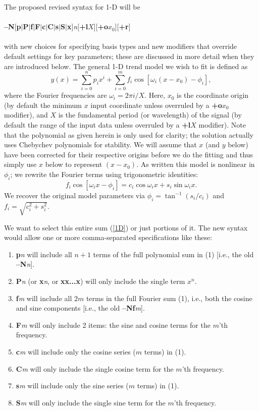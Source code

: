 \documentclass[12pt,letterpaper,margin=0.5in]{report}
\begin{document}
The proposed revised syntax for 1-D will be
\\ \\
{\bf --N}[{\bf p}$|${\bf P}$|${\bf f}$|${\bf F}$|${\bf c}$|${\bf C}$|${\bf s}$|${\bf S}$|${\bf x}]{\it n}[{\bf +l}$X$][{\bf +o}$x_0$][{\bf +r}]
\\ \\
with new choices for specifying basis types and new modifiers that override default settings for key parameters; these are discussed
in more detail when they are introduced below.
The general 1-D trend model we wish to fit is defined as
\begin{equation}
y(x) = \sum_{i = 0}^n p_i x^i + \sum_{i = 0}^m  f_i \cos \left [\omega_i (x-x_0) - \phi_i \right ],
\label{1D}
\end{equation}
where the Fourier frequencies are $\omega_i = 2 \pi i / X$.  Here, $x_0$ is the coordinate origin (by default the minimum $x$ input coordinate unless overruled by
a {\bf +o}$x_0$ modifier), and $X$ is the fundamental period (or wavelength) of the signal (by default the range of the input data unless overruled by a {\bf +l}$X$ modifier). Note that the polynomial as given herein is only used for clarity; the solution actually uses Chebychev polynomials for stability.
We will assume that $x$ (and $y$ below) have been corrected for their respective origins before we do the fitting and thus simply
use $x$ below to represent $(x-x_0)$.  As written this model is nonlinear in $\phi_i$; we rewrite the Fourier terms using trigonometric identities:
\begin{equation}
f_i \cos \left [\omega_i x - \phi_i \right ] =  c_i \cos \omega_i x  + s_i \sin \omega_i x .
\end{equation}
We recover the original model parameters via $\phi_i = \tan^{-1}(s_i/c_i)$ and $f_i = \sqrt{c_i^2 + s_i^2}$.
\par
We want to select this entire sum (\ref{1D}) or just portions of it.  The new syntax would allow one or more comma-separated specifications like these:
\begin{enumerate}
	\item {\bf p}{\it n} will include all $n+1$ terms of the full polynomial sum in (1) [i.e., the old {\bf --N}{\it n}].
	\item {\bf P}{\it n} (or {\bf x}{\it n}, or {\bf xx...x}) will only include the single term $x^n$.
	\item {\bf f}{\it m} will include all $2m$ terms in the full Fourier sum (1), i.e., both the cosine and sine components [i.e., the old {\bf --Nf}{\it m}].
	\item {\bf F}{\it m} will only include 2 items: the sine and cosine terms for the $m$'th frequency.
	\item {\bf c}{\it m} will include only the cosine series ($m$ terms) in (1).
	\item {\bf C}{\it m} will only include the single cosine term for the $m$'th frequency.
	\item {\bf s}{\it m} will include only the sine series ($m$ terms) in (1).
	\item {\bf S}{\it m} will only include the single sine term for the $m$'th frequency.
\end{enumerate}
\end{document}
